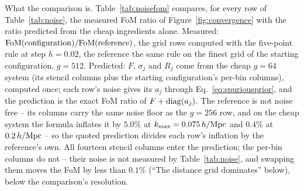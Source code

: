 \documentclass[11pt]{article}
\newcommand{\kmax}{k_{\rm max}}
\newcommand{\hMpc}{\,h/{\rm Mpc}}
\begin{document}
What the comparison is.  Table~\ref{tab:noisefom} compares, for
every row of Table~\ref{tab:noise}, the measured FoM ratio of
Figure~\ref{fig:convergence} with the ratio predicted from the
cheap ingredients alone.  Measured:
${\rm FoM}({\rm configuration})/{\rm FoM}({\rm reference})$, the
grid rows computed with the five-point rule at step $h = 0.02$, the
reference the same rule on the finest grid of the starting
configuration, $g = 512$.  Predicted: $F$, $\sigma_j$ and $R_j$
come from the cheap $g = 64$ system (its stencil columns plus the
starting configuration's per-bin columns), computed once; each
row's noise gives its $a_j$ through Eq.~\eqref{eq:spuriousprior},
and the prediction is the exact FoM ratio of
$F + {\rm diag}(a_j)$.  The reference is not noise free -- its
columns carry the same noise floor as the $g = 256$ row, and on
the cheap system the formula inflates it by $5.0\%$ at
$\kmax = 0.075\hMpc$ and $0.4\%$ at $0.2\hMpc$ -- so the quoted
prediction divides each row's inflation by the reference's own.
All fourteen stencil columns enter the prediction; the per-bin
columns do not -- their noise is not measured by
Table~\ref{tab:noise}, and swapping them moves the FoM by less
than $0.1\%$ (``The distance grid dominates'' below), below the
comparison's resolution.
\end{document}
